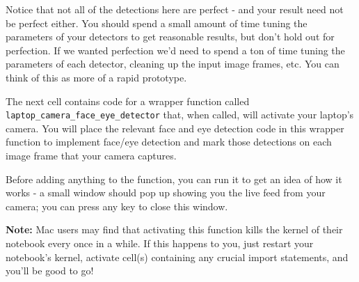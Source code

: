 \documentclass[11pt]{article}
\begin{document}
Notice that not all of the detections here are perfect - and your result
need not be perfect either. You should spend a small amount of time
tuning the parameters of your detectors to get reasonable results, but
don't hold out for perfection. If we wanted perfection we'd need to
spend a ton of time tuning the parameters of each detector, cleaning up
the input image frames, etc. You can think of this as more of a rapid
prototype.

The next cell contains code for a wrapper function called
\texttt{laptop\_camera\_face\_eye\_detector} that, when called, will
activate your laptop's camera. You will place the relevant face and eye
detection code in this wrapper function to implement face/eye detection
and mark those detections on each image frame that your camera captures.

Before adding anything to the function, you can run it to get an idea of
how it works - a small window should pop up showing you the live feed
from your camera; you can press any key to close this window.

\textbf{Note:} Mac users may find that activating this function kills
the kernel of their notebook every once in a while. If this happens to
you, just restart your notebook's kernel, activate cell(s) containing
any crucial import statements, and you'll be good to go!
\end{document}
